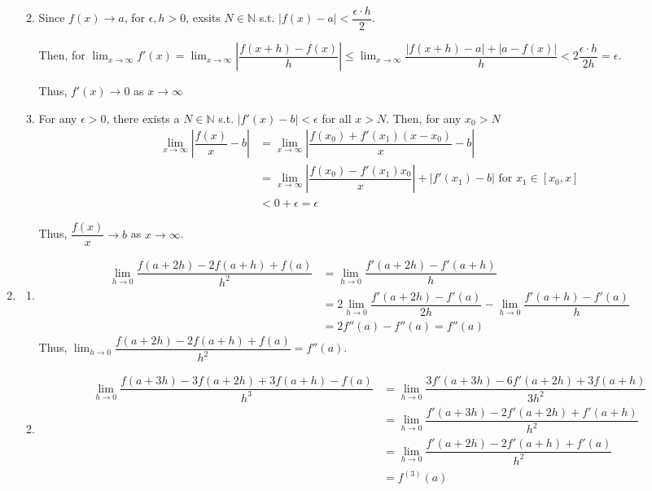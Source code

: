 \documentclass[12pt]{article}
\begin{document}
\begin{enumerate}
\begin{enumerate}
        \newpage
        \item Since $f(x) \to a$, for $\epsilon, h> 0$, exsits $N\in\mathbb{N}$ s.t. $|f(x) - a| < \dfrac{\epsilon \cdot h}{2}$.
        
        Then, for $\displaystyle\lim_{x\to\infty} f'(x) = \displaystyle\lim_{x\to\infty} |\dfrac{f(x + h)-f(x)}{h}| \leq \displaystyle\lim_{x\to\infty} \dfrac{|f(x + h) - a| + |a - f(x)|}{h} < 2\dfrac{\epsilon\cdot h}{2h} = \epsilon$.

        Thus, $f'(x) \to 0$ as $x\to \infty$

        \item For any $\epsilon > 0$, there exists a $N\in\mathbb{N}$ s.t. $|f'(x) - b| < \epsilon$ for all $x > N$.
        Then, for any $x_0 > N$
        \begin{align*}
            \lim_{x\to\infty}|\dfrac{f(x)}{x} - b| &= \lim_{x\to\infty}|\dfrac{f(x_0) + f'(x_1)(x-x_0)}{x} - b|\\
            &=\lim_{x\to\infty} |\dfrac{f(x_0)- f'(x_1)x_0}{x}| + |f'(x_1) - b|\text{ for } x_1\in [x_0, x]\\
            &< 0 + \epsilon = \epsilon
        \end{align*}

        Thus, $\dfrac{f(x)}{x} \to b$ as $x\to\infty$.
    \end{enumerate}

    \item\begin{enumerate}
        \item \begin{align*}
            \lim_{h\to 0} \dfrac{f(a+2h)-2f(a+h)+f(a)}{h^2} &= \lim_{h\to 0} \dfrac{f'(a+2h) - f'(a+h)}{h}\\
            &= 2\lim_{h\to 0} \dfrac{f'(a + 2h) - f'(a)}{2h} - \lim_{h\to 0}\dfrac{f'(a + h) - f'(a)}{h}\\
            &= 2f''(a) - f''(a) = f''(a)
        \end{align*}    
        Thus, $\displaystyle\lim_{h\to 0} \dfrac{f(a+2h)-2f(a+h)+f(a)}{h^2} = f''(a)$.

        \item \begin{align*}
            \lim_{h\to 0} \dfrac{f(a + 3h) - 3f(a + 2h) + 3f(a + h) - f(a)}{h^3} &= \lim_{h\to 0} \dfrac{3f'(a+3h) - 6f'(a + 2h) + 3f(a + h)}{3h^2}\\
            &= \lim_{h\to 0} \dfrac{f'(a + 3h) - 2f'(a+2h) + f'(a + h)}{h^2}\\
            &= \lim_{h\to 0} \dfrac{f'(a + 2h) - 2f'(a + h) + f'(a)}{h^2}\\
            &= f^{(3)}(a)
        \end{align*}

    \end{enumerate}
\end{enumerate}
\end{document}
